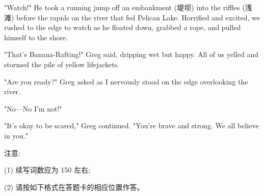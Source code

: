 \documentclass{英语试卷}
\begin{document}
\par "Watch!" He took a running jump off an embankment (堤坝) into the riffles (浅滩) before the rapids on the river that fed Pelican Lake. Horrified and excited, we rushed to the edge to watch as he floated down, grabbed a rope, and pulled himself to the shore.\par
\par "That's Banana-Rafting!" Greg said, dripping wet but happy. All of us yelled and stormed the pile of yellow lifejackets.\par
\par "Are you ready?" Greg asked as I nervously stood on the edge overlooking the river.\par
\par "No—No I'm not!"\par
\par "It's okay to be scared," Greg continued. "You're brave and strong. We all believe in you."\par
\par 注意:\par
\par (1) 续写词数应为 150 左右;\par
\par (2) 请按如下格式在答题卡的相应位置作答。\par
{}
\end{document}
